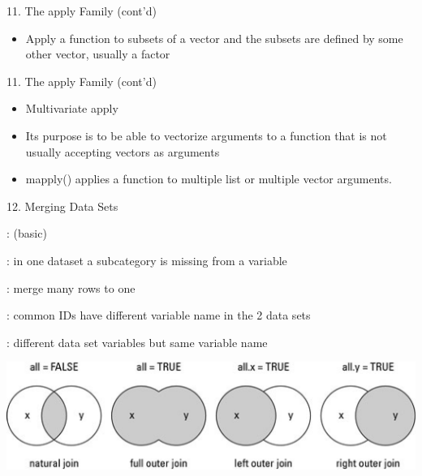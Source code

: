 \documentclass[14pt, aspectratio=169, sectionpage=simple, xclolor=table]{beamer}
\begin{document}
\begin{frame}[fragile]{11. The apply Family  (cont'd)}
\begin{itemize}
\item Apply a function to subsets of a vector and the subsets are defined by some other vector, usually a factor
\end{itemize}
\end{frame}
\begin{frame}[fragile]{11. The apply Family  (cont'd)}
\begin{itemize}
\item Multivariate apply
\item Its purpose is to be able to vectorize arguments to a function that is not usually accepting vectors as arguments
\item mapply() applies a function to multiple list or multiple vector arguments.
\end{itemize}

\end{frame}
\begin{frame}[fragile]{12. Merging Data Sets}
\begin{itemize}
\end{itemize}
\centering
\includegraphics[scale=0.75]{Figures/merge.eps}
\end{frame}
\end{document}
